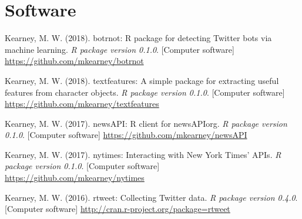 \section{Software}
\begin{bibenum}

\item Kearney, M. W. (2018). botrnot: R package for detecting Twitter bots via machine learning.
\textit{R package version 0.1.0}. [Computer software]
\href{https://github.com/mkearney/botrnot}{https://github.com/mkearney/botrnot}

\item Kearney, M. W. (2018). textfeatures: A simple package for extracting useful features from character objects.
\textit{R package version 0.1.0}. [Computer software]
\href{https://github.com/mkearney/textfeatures}{https://github.com/mkearney/textfeatures}

\item Kearney, M. W. (2017). newsAPI: R client for newsAPIorg.
\textit{R package version 0.1.0}. [Computer software]
\href{https://github.com/mkearney/newsAPI}{https://github.com/mkearney/newsAPI}

\item Kearney, M. W. (2017). nytimes: Interacting with New York Times' APIs.
\textit{R package version 0.1.0}. [Computer software]
\href{https://github.com/mkearney/nytimes}{https://github.com/mkearney/nytimes}

\item Kearney, M. W. (2016). rtweet: Collecting Twitter data.
\textit{R package version 0.4.0}. [Computer software]
\href{http://cran.r-project.org/package=rtweet}{http://cran.r-project.org/package=rtweet}
\end{bibenum}

